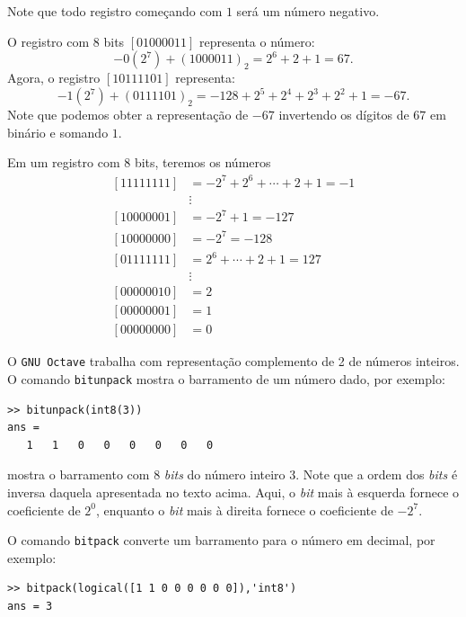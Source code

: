 \begin{obs}
  Note que todo registro começando com $1$ será um número negativo.
\end{obs}


\begin{ex}
 O registro com $8$ bits $[01000011]$ representa o número:
 \begin{equation}
   -0(2^7) + (1000011)_2 = 2^6 + 2 + 1 = 67.
 \end{equation}
 Agora, o registro $[10111101]$ representa:
 \begin{equation}
   -1(2^7) + (0111101)_2 = -128 + 2^5 + 2^4 + 2^3 + 2^2 + 1 = -67.
 \end{equation}
 Note que podemos obter a representação de $-67$ invertendo os dígitos de $67$ em binário e somando $1$.
\end{ex}

\begin{ex}
Em um registro com $8$ bits, teremos os números
\begin{equation}
  \begin{split}
    [11111111] &= -2^7+2^{6}+\cdots+2+1=-1\\
    &\vdots   \\
    [10000001] &= -2^7+1 = -127 \\
    [10000000] &= -2^7   = -128 \\
    [01111111] &= 2^6+\cdots+2+1=127 \\
    &\vdots   \\
    [00000010] &= 2 \\
    [00000001] &= 1 \\
    [00000000] &= 0
  \end{split}
\end{equation}

O \verb+GNU Octave+ trabalha com representação complemento de 2 de números inteiros. O comando \verb+bitunpack+ mostra o barramento de um número dado, por exemplo:
\begin{verbatim}
>> bitunpack(int8(3))
ans =
   1   1   0   0   0   0   0   0
\end{verbatim}
mostra o barramento com $8$ \emph{bits} do número inteiro $3$. Note que a ordem dos \emph{bits} é inversa daquela apresentada no texto acima. Aqui, o \emph{bit} mais à esquerda fornece o coeficiente de $2^0$, enquanto o \emph{bit} mais à direita fornece o coeficiente de $-2^7$.

O comando \verb+bitpack+ converte um barramento para o número em decimal, por exemplo:
\begin{verbatim}
>> bitpack(logical([1 1 0 0 0 0 0 0]),'int8')
ans = 3
\end{verbatim}

\end{ex}

